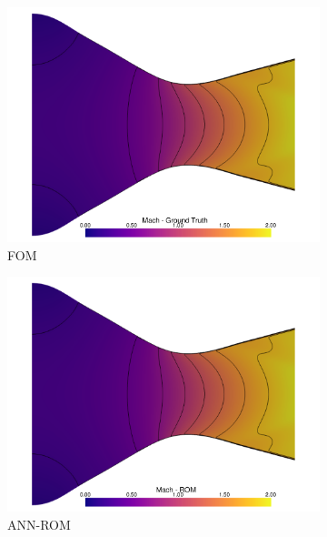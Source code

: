 \documentclass[tg, EN]{ufabcFHZh_tg}
\begin{document}
\begin{figure}[H]
    \centering
    \begin{subfigure}[b]{0.32\textwidth}
        \centering
        \includegraphics[width=\textwidth]{Figuras/nn_ground_truth_mach.pdf}
        \caption{FOM}
    \end{subfigure}
    \hfill
    \begin{subfigure}[b]{0.32\textwidth}
        \centering
        \includegraphics[width=\textwidth]{Figuras/nn_prediction_mach.pdf}
        \caption{ANN-ROM}
    \end{subfigure}
    \hfill
    \begin{subfigure}[b]{0.32\textwidth}
        \centering

\end{subfigure}
\end{figure}
\end{document}
